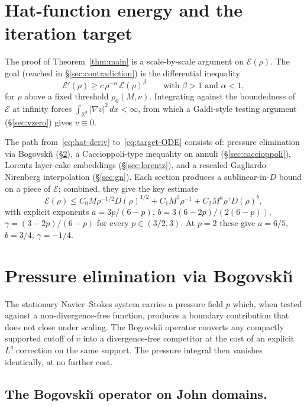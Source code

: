 \documentclass[11pt]{amsart}
\theoremstyle{definition}
\newcommand{\RR}{\mathbb{R}}
\newcommand{\EE}{\mathcal{E}}    %
\newcommand{\DD}{D}              %
\newcommand{\abs}[1]{|#1|}
\begin{document}
\section{Hat-function energy and the iteration target}\label{sec:hat}

The proof of Theorem~\ref{thm:main} is a scale-by-scale argument
on $\EE(\rho)$. The goal (reached in \S\ref{sec:contradiction})
is the differential inequality
\begin{equation}\label{eq:target-ODE}
\EE'(\rho) \geq c\, \rho^{-\alpha}\, \EE(\rho)^\beta
\qquad \text{with } \beta > 1 \text{ and } \alpha < 1,
\end{equation}
for $\rho$ above a fixed threshold $\rho_0(M, \nu)$. Integrating
against the boundedness of $\EE$ at infinity forces
$\int_{\RR^3} \abs{\nabla v}^2\, dx < \infty$, from which a
Galdi-style testing argument (\S\ref{sec:vzero}) gives $v \equiv 0$.

The path from~\eqref{eq:hat-deriv} to~\eqref{eq:target-ODE}
consists of: pressure elimination via Bogovski\u{\i}
(\S\ref{sec:pressure}), a Caccioppoli-type inequality on annuli
(\S\ref{sec:caccioppoli}), Lorentz layer-cake embeddings
(\S\ref{sec:lorentz}), and a rescaled Gagliardo--Nirenberg
interpolation (\S\ref{sec:gn}). Each section produces a
sublinear-in-$\DD$ bound on a piece of $\EE$; combined, they give
the key estimate
\[
\EE(\rho) \leq C_0 M \rho^{-1/2} \DD(\rho)^{1/2}
          + C_1 M^3 \rho^{-1}
          + C_2 M^a \rho^\gamma \DD(\rho)^b,
\]
with explicit exponents $a = 3p/(6-p)$, $b = 3(6-2p)/(2(6-p))$,
$\gamma = (3-2p)/(6-p)$ for every $p \in (3/2, 3)$. At $p = 2$
these give $a = 6/5$, $b = 3/4$, $\gamma = -1/4$.

\section{Pressure elimination via Bogovski\u{\i}}\label{sec:pressure}

The stationary Navier--Stokes system carries a pressure field $p$
which, when tested against a non-divergence-free function,
produces a boundary contribution that does not close under
scaling. The Bogovski\u{\i} operator converts any compactly
supported cutoff of $v$ into a divergence-free competitor at the
cost of an explicit $L^q$ correction on the same support. The
pressure integral then vanishes identically, at no further cost.

\subsection{The Bogovski\u{\i} operator on John domains.}
\label{ssec:bogo}
\end{document}
